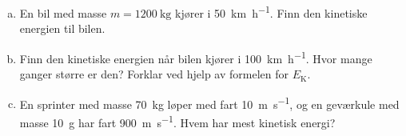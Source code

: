 %
\begin{enumerate}[a)]
    \item En bil med masse $m = \SI{1200}{\kilo\gram}$ kjører i \SI{50}{\kilo\metre\per\hour}. Finn den kinetiske energien til bilen.
    \item Finn den kinetiske energien når bilen kjører i \SI{100}{\kilo\metre\per\hour}. Hvor mange ganger større er den? Forklar ved hjelp av formelen for $E_\text{K}$.
    \item En sprinter med masse \SI{70}{\kilo\gram} løper med fart \SI{10}{\metre\per\second}, og en geværkule med masse \SI{10}{\gram} har fart \SI{900}{\metre\per\second}. Hvem har mest kinetisk energi?
\end{enumerate}
